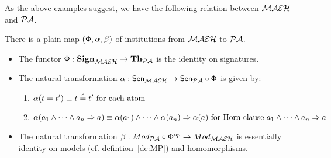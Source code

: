 \documentclass[10pt]{article}
\begin{document}
As the above examples suggest, we have the following relation between
${\mathcal{MAEH}}$ and ${\mathcal{PA}}$.

\begin{proposition}
There is a plain map  $({\sf {\Phi}},\alpha, \beta)$ of institutions from ${\mathcal{MAEH}}$ to ${\mathcal{PA}}$.
\end{proposition}
%
\begin{PROOF}
\begin{itemize}
\item The functor ${\sf {\Phi}}: {\bf Sign}_{{\mathcal{MAEH}}} \to {\bf Th}_{{\mathcal{PA}}}$ is the identity on signatures.
	
\item The natural transformation $\alpha: {\sf {Sen}}_{{\mathcal{MAEH}}} \to {\sf {Sen}}_{{\mathcal{PA}}} \circ {\sf {\Phi}}$ is given by:
	\begin{enumerate}
	 \item $\alpha(t \mathrel{\dot{=} } t') \equiv t \stackrel{e}{=} t'\mbox{ for each atom }$
	 \item $\alpha(a_1 \wedge \cdots \wedge a_n \Rightarrow a) \equiv \alpha(a_1) \wedge \cdots \wedge \alpha(a_n) \Rightarrow \alpha(a)\mbox{ for Horn clause }a_1 \wedge \cdots \wedge a_n \Rightarrow a$
	\end{enumerate}

\item The natural transformation $\beta: Mod_{{\mathcal{PA}}}
	\circ {\sf {\Phi}}^{op} \to Mod_{{\mathcal{MAEH}}}$ is essentially identity
	on models (cf. defintion~\ref{de:MP}) and homomorphisms.
\end{itemize} \vspace*{-3ex}
\end{PROOF}\vspace*{-5ex}
%
\end{document}
